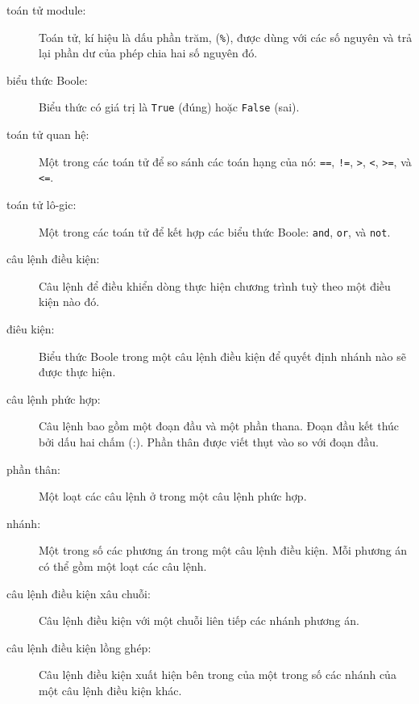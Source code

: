 \documentclass[11pt]{book}
\begin{document}
\begin{description}

\item[toán tử module:]  Toán tử, kí hiệu là dấu phần trăm,
({\tt \%}), được dùng với các số nguyên và trả lại phần dư của phép
chia hai số nguyên đó.

\item[biểu thức Boole:]  Biểu thức có giá trị là 
{\tt True} (đúng) hoặc {\tt False} (sai).

\item[toán tử quan hệ:] Một trong các toán tử để so sánh các toán hạng 
của nó: {\tt ==}, {\tt !=}, {\tt >}, {\tt <}, {\tt >=}, và {\tt <=}.

\item[toán tử lô-gic:] Một trong các toán tử để kết hợp các biểu thức Boole:
{\tt and}, {\tt or}, và {\tt not}.

\item[câu lệnh điều kiện:]  Câu lệnh để điều khiển dòng thực hiện 
chương trình tuỳ theo một điều kiện nào đó.

\item[điêu kiện:]  Biểu thức Boole trong một câu lệnh điều kiện để quyết định
nhánh nào sẽ được thực hiện.

\item[câu lệnh phức hợp:]  Câu lệnh bao gồm một đoạn đầu và một phần
thana. Đoạn đầu kết thúc bởi dấu hai chấm (:).  Phần thân được viết thụt vào so
với đoạn đầu.

\item[phần thân:] Một loạt các câu lệnh ở trong một câu lệnh phức hợp.

\item[nhánh:] Một trong số các phương án trong một câu lệnh điều kiện.
Mỗi phương án có thể gồm một loạt các câu lệnh.

\item[câu lệnh điều kiện xâu chuỗi:]  Câu lệnh điều kiện với một chuỗi liên tiếp
các nhánh phương án.

\item[câu lệnh điều kiện lồng ghép:]  Câu lệnh điều kiện xuất hiện bên trong của
một trong số các nhánh của một câu lệnh điều kiện khác.


\end{description}
\end{document}
